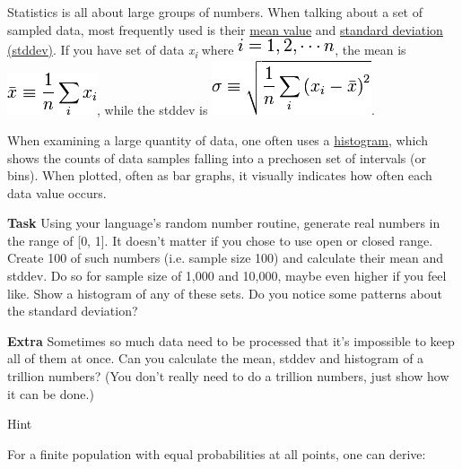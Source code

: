 \begin{itemize}
Statistics is all about large groups of numbers. When talking about a
set of sampled data, most frequently used is their
\href{http://en.wikipedia.org/wiki/Mean}{mean value} and
\href{http://en.wikipedia.org/wiki/3333Standard\_deviation}{standard
deviation (stddev)}. If you have set of data
\emph{x}\textsubscript{\emph{i}} where
\includegraphics[scale=.6]{graphics/4a4a450cda66c931dce2ee4b3b3af329.png},
the mean is
\includegraphics[scale=.6]{graphics/520b3480cda5c9ab4ab7691ae9cdd696.png},
while the stddev is
\includegraphics[scale=.6]{graphics/d678d4d0af6d46165b3712e36b9718d9.png}.

When examining a large quantity of data, one often uses a
\href{http://en.wikipedia.org/wiki/Histogram}{histogram}, which shows
the counts of data samples falling into a prechosen set of intervals (or
bins). When plotted, often as bar graphs, it visually indicates how
often each data value occurs.

\textbf{Task} Using your language's random number routine, generate real
numbers in the range of {[}0, 1{]}. It doesn't matter if you chose to
use open or closed range. Create 100 of such numbers (i.e. sample size
100) and calculate their mean and stddev. Do so for sample size of 1,000
and 10,000, maybe even higher if you feel like. Show a histogram of any
of these sets. Do you notice some patterns about the standard deviation?

\textbf{Extra} Sometimes so much data need to be processed that it's
impossible to keep all of them at once. Can you calculate the mean,
stddev and histogram of a trillion numbers? (You don't really need to do
a trillion numbers, just show how it can be done.)

\begin{description}
\item[Hint]
\end{description}

For a finite population with equal probabilities at all points, one can
derive:


\end{itemize}
